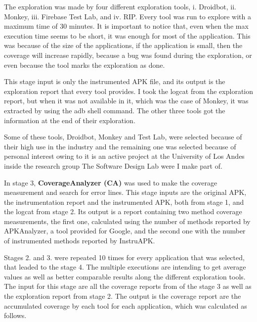 The exploration was made by four different exploration tools, i. Droidbot, ii. Monkey, iii. Firebase Test Lab, and iv. RIP. Every tool was run to explore with a maximum time of 30 minutes. It is important to notice that, even when the max execution time seems to be short, it was enough for most of the application. This was because of the size of the applications, if the application is small, then the coverage will increase rapidly, because a bug was found during the exploration, or even because the tool marks the exploration as done. 

This stage input is only the instrumented APK file, and its output is the exploration report that every tool provides. I took the logcat from the exploration report, but when it was not available in it, which was the case of Monkey, it was extracted by using the adb shell command. The other three tools got the information at the end of their exploration.
 

Some of these tools, Droidbot, Monkey and Test Lab, were selected because of their high use in the industry and the remaining one was selected because of personal interest owing to it is an active project at the University of Los Andes inside the research group The Software Design Lab were I make part of. 

In stage 3, \textbf{CoverageAnalyzer (CA)} was used to make the coverage measurement and search for error lines. This stage inputs are the original APK, the instrumentation report and the instrumented APK, both from stage 1, and the logcat from stage 2. Its output is a report containing two method coverage measurements, the first one, calculated using the number of methods reported by APKAnalyzer, a tool provided for Google, and the second one with the number of instrumented methods reported by InstruAPK.


Stages 2. and 3. were repeated 10 times for every application that was selected, that leaded to the stage 4. The multiple executions are intending to get average values as well as better comparable results along the different exploration tools. The input for this stage are all the coverage reports from of the stage 3 as well as the exploration report from stage 2. The output is the coverage report are the accumulated coverage by each tool for each application, which was calculated as follows. 

